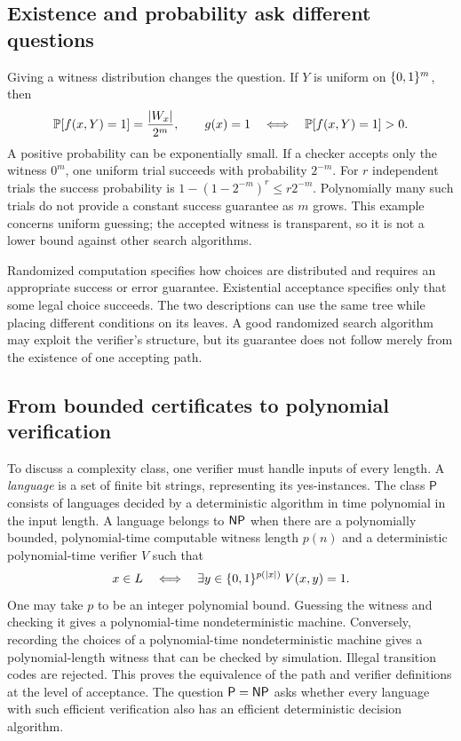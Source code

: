 \subsection{Existence and probability ask different questions}

Giving a witness distribution changes the question. If $Y$ is uniform on
$\{0,1\}^m$, then
\[
 \mathbb{P}[f(x,Y)=1]=\frac{|W_x|}{2^m},
 \qquad
 g(x)=1\quad\Longleftrightarrow\quad\mathbb{P}[f(x,Y)=1]>0.
\]
A positive probability can be exponentially small. If a checker accepts
only the witness $0^m$, one uniform trial succeeds with probability $2^{-m}$.
For $r$ independent trials the success probability is
$1-(1-2^{-m})^r\le r2^{-m}$. Polynomially many such trials do not provide
a constant success guarantee as $m$ grows. This example concerns uniform
guessing; the accepted witness is transparent, so it is not a lower bound
against other search algorithms.

Randomized computation specifies how choices are distributed and requires
an appropriate success or error guarantee. Existential acceptance specifies
only that some legal choice succeeds. The two descriptions can use the same
tree while placing different conditions on its leaves. A good randomized
search algorithm may exploit the verifier's structure, but its guarantee
does not follow merely from the existence of one accepting path.

\subsection{From bounded certificates to polynomial verification}

To discuss a complexity class, one verifier must handle inputs of every
length. A \emph{language} is a set of finite bit strings, representing its
yes-instances. The class $\mathsf P$ consists of languages decided by a
deterministic algorithm in time polynomial in the input length. A language
belongs to $\mathsf{NP}$ when there are a polynomially bounded,
polynomial-time computable witness length $p(n)$ and a deterministic polynomial-time
verifier $V$ such that
\begin{equation}\label{eq:foundations-np}
 x\in L\quad\Longleftrightarrow\quad
 \exists y\in\{0,1\}^{p(|x|)}\; V(x,y)=1.
\end{equation}
One may take $p$ to be an integer polynomial bound. Guessing the witness
and checking it gives a polynomial-time nondeterministic machine.
Conversely, recording the choices of a polynomial-time nondeterministic
machine gives a polynomial-length witness that can be checked by simulation.
Illegal transition codes are rejected. This proves the equivalence of the
path and verifier definitions at the level of acceptance.
The question $\mathsf P=\mathsf{NP}$ asks whether every language with such efficient
verification also has an efficient deterministic decision algorithm.

